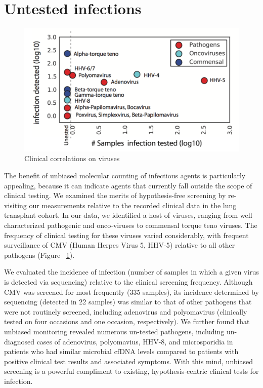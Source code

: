 \section{Untested infections}

\begin{figure}
\center\includegraphics[width=150mm,scale=0.5]{Figures/Fig11}
\caption{Clinical correlations on viruses}
\label{fig:Fig11}
\end{figure}

The benefit of unbiased molecular counting of infectious agents is particularly appealing, because it can indicate agents that currently fall outside the scope of clinical testing. We examined the merits of hypothesis-free screening by re-visiting our measurements relative to the recorded clinical data in the lung transplant cohort. In our data, we identified a host of viruses, ranging from well characterized pathogenic and onco-viruses to commensal torque teno viruses. The frequency of clinical testing for these viruses varied considerably, with frequent surveillance of CMV (Human Herpes Virus 5, HHV-5) relative to all other pathogens (Figure ~\ref{fig:Fig11}). 

We evaluated the incidence of infection (number of samples in which a given virus is detected via sequencing) relative to the clinical screening frequency. Although CMV was screened for most frequently (335 samples), its incidence determined by sequencing (detected in 22 samples) was similar to that of other pathogens that were not routinely screened, including adenovirus and polyomavirus (clinically tested on four occasions and one occasion, respectively). We further found that unbiased monitoring revealed numerous un-tested pathogens, including un-diagnosed cases of adenovirus, polyomavius, HHV-8, and microsporidia in patients who had similar microbial cfDNA levels compared to patients with positive clinical test results and associated symptoms. With this mind, unbiased screening is a powerful compliment to existing, hypothesis-centric clinical tests for infection.
